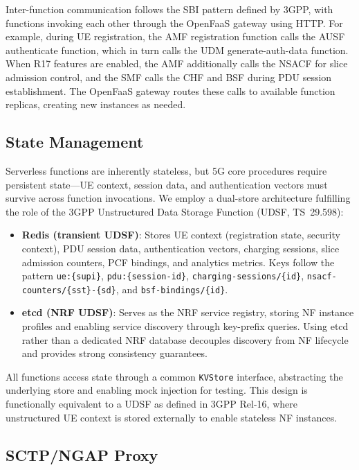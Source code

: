 \documentclass[conference]{IEEEtran}
\begin{document}
Inter-function communication follows the SBI pattern defined by 3GPP, with functions invoking each other through the OpenFaaS gateway using HTTP. For example, during UE registration, the AMF registration function calls the AUSF authenticate function, which in turn calls the UDM generate-auth-data function. When R17 features are enabled, the AMF additionally calls the NSACF for slice admission control, and the SMF calls the CHF and BSF during PDU session establishment. The OpenFaaS gateway routes these calls to available function replicas, creating new instances as needed.

\subsection{State Management}

Serverless functions are inherently stateless, but 5G core procedures require persistent state---UE context, session data, and authentication vectors must survive across function invocations. We employ a dual-store architecture fulfilling the role of the 3GPP Unstructured Data Storage Function (UDSF, TS~29.598):

\begin{itemize}
    \item \textbf{Redis (transient UDSF)}: Stores UE context (registration state, security context), PDU session data, authentication vectors, charging sessions, slice admission counters, PCF bindings, and analytics metrics. Keys follow the pattern \texttt{ue:\{supi\}}, \texttt{pdu:\{session-id\}}, \texttt{charging-sessions/\{id\}}, \texttt{nsacf-counters/\{sst\}-\{sd\}}, and \texttt{bsf-bindings/\{id\}}.
    \item \textbf{etcd (NRF UDSF)}: Serves as the NRF service registry, storing NF instance profiles and enabling service discovery through key-prefix queries. Using etcd rather than a dedicated NRF database decouples discovery from NF lifecycle and provides strong consistency guarantees.
\end{itemize}

All functions access state through a common \texttt{KVStore} interface, abstracting the underlying store and enabling mock injection for testing. This design is functionally equivalent to a UDSF as defined in 3GPP Rel-16, where unstructured UE context is stored externally to enable stateless NF instances.

\subsection{SCTP/NGAP Proxy}
\end{document}
